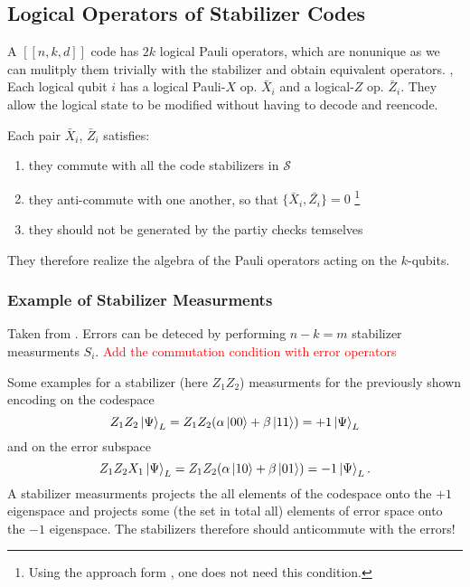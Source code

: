 \subsection{Logical Operators of Stabilizer Codes}
A $[[n,k,d]]$ code has $2k$ logical Pauli operators, which are nonunique as we can mulitply them trivially with the stabilizer and obtain equivalent operators. \cite{QECintro},\cite{QECmemory} 
Each logical qubit $i$ has a logical Pauli-$X$ op. $\bar{X}_i$ and a logical-$Z$ op. $\bar{Z}_i$. 
They allow the logical state to be modified without having to decode and reencode. \cite{QECintro}

Each pair $\bar{X}_i$, $\bar{Z}_i$ satisfies:
\begin{enumerate}
    \item they commute with all the code stabilizers in $\mathcal{S}$ 
    \item they anti-commute with one another, so that $\{ \bar{X}_i, \bar{Z_i}\}=0$ \footnote{Using the approach form \cite{QECmemory}, one does not need this condition.}
    \item they should not be generated by the partiy checks temselves \cite{QECmemory}
\end{enumerate}
They therefore realize the algebra of the Pauli operators acting on the $k$-qubits. \cite{QECmemory}


\subsubsection{Example of Stabilizer Measurments}
Taken from \cite{QECintro}.
Errors can be deteced by performing $n-k=m$ stabilizer measurments $S_i$.
\textcolor{red}{Add the commutation condition with error operators}

Some examples for a stabilizer (here $Z_1 Z_2$) measurments for the previously shown encoding on the codespace
\begin{equation}
    Z_1 Z_2 \ket{\Psi}_L = Z_1 Z_2 (\alpha \ket{00}+ \beta \ket{11}) = +1 \ket{\Psi}_L
\end{equation}
and on the error subspace
\begin{equation}
    Z_1 Z_2 X_1\ket{\Psi}_L = Z_1 Z_2 (\alpha \ket{10}+ \beta \ket{01}) = -1 \ket{\Psi}_L.
\end{equation}
A stabilizer measurments projects the all elements of the codespace onto the $+1$ eigenspace 
and projects some (the set in total all) elements of error space onto the $-1$ eigenspace. 
The stabilizers therefore should anticommute with the errors! 

